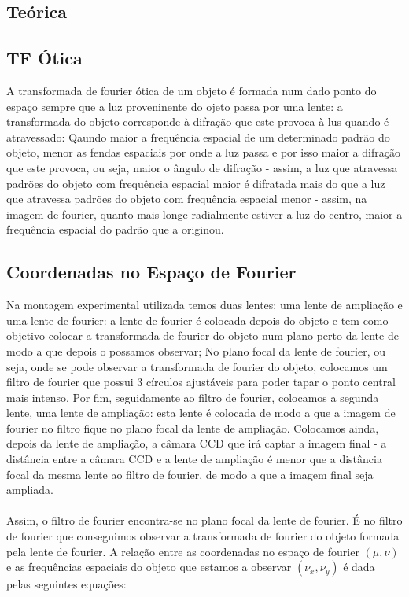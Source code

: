 \documentclass{article}
\begin{document}
\begin{multicols}{2}

\section{Teórica}

\subsection{TF Ótica}

A transformada de fourier ótica de um objeto é formada num dado ponto do espaço sempre que a luz proveninente do ojeto passa por uma lente: a transformada do objeto corresponde à difração que este provoca à lus quando é atravessado:
Qaundo maior a frequência espacial de um determinado padrão do objeto, menor as fendas espaciais por onde a luz passa e por isso maior a difração que este provoca, ou seja, maior o ângulo de difração - assim, a luz que atravessa padrões do objeto com frequência espacial maior é difratada mais do que a luz que atravessa padrões do objeto com frequência espacial menor - assim, na imagem de fourier, quanto mais longe radialmente estiver a luz do centro, maior a frequência espacial do padrão que a originou.

\subsection{Coordenadas no Espaço de Fourier}

Na montagem experimental utilizada temos duas lentes: uma lente de ampliação e uma lente de fourier: a lente de fourier é colocada depois do objeto e tem como objetivo colocar a transformada de fourier do objeto num plano perto da lente de modo a que depois o possamos observar;
No plano focal da lente de fourier, ou seja, onde se pode observar a transformada de fourier do objeto, colocamos um filtro de fourier que possui 3 círculos ajustáveis para poder tapar o ponto central mais intenso.
Por fim, seguidamente ao filtro de fourier, colocamos a segunda lente, uma lente de ampliação: esta lente é colocada de modo a que a imagem de fourier no filtro fique no plano focal da lente de ampliação. 
Colocamos ainda, depois da lente de ampliação, a câmara CCD que irá captar a imagem final - a distância entre a câmara CCD e a lente de ampliação é menor que a distância focal da mesma lente ao filtro de fourier, de modo a que a imagem final seja ampliada.
\paragraph{}
Assim, o filtro de fourier encontra-se no plano focal da lente de fourier. É no filtro de fourier que conseguimos observar a transformada de fourier do objeto formada pela lente de fourier.
A relação entre as coordenadas no espaço de fourier $(\mu, \nu)$ e as frequências espaciais do objeto que estamos a observar $(\nu_x, \nu_y)$ é dada pelas seguintes equações:


\end{multicols}
\end{document}
